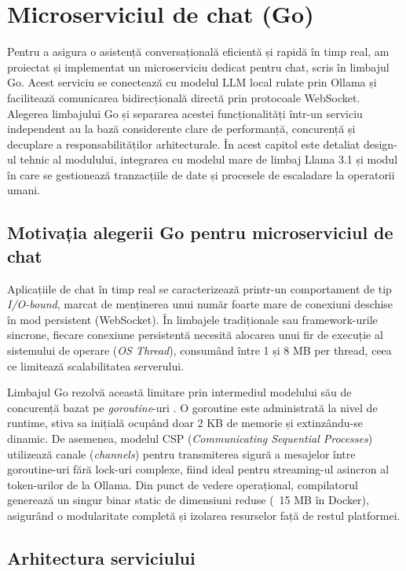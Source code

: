\chapter{Microserviciul de chat (Go)}

Pentru a asigura o asistență conversațională eficientă și rapidă în timp real, am proiectat și implementat un microserviciu dedicat pentru chat, scris în limbajul Go. Acest serviciu se conectează cu modelul LLM local rulate prin Ollama și facilitează comunicarea bidirecțională directă prin protocoale WebSocket. Alegerea limbajului Go și separarea acestei funcționalități într-un serviciu independent au la bază considerente clare de performanță, concurență și decuplare a responsabilităților arhitecturale. În acest capitol este detaliat design-ul tehnic al modulului, integrarea cu modelul mare de limbaj Llama 3.1 și modul în care se gestionează tranzacțiile de date și procesele de escaladare la operatorii umani.

\section{Motivația alegerii Go pentru microserviciul de chat}

Aplicațiile de chat în timp real se caracterizează printr-un comportament de tip \textit{I/O-bound}, marcat de menținerea unui număr foarte mare de conexiuni deschise în mod persistent (WebSocket). În limbajele tradiționale sau framework-urile sincrone, fiecare conexiune persistentă necesită alocarea unui fir de execuție al sistemului de operare (\textit{OS Thread}), consumând între 1 și 8 MB per thread, ceea ce limitează scalabilitatea serverului.

Limbajul Go rezolvă această limitare prin intermediul modelului său de concurență bazat pe \textit{goroutine}-uri \cite{go2026concurrency}. O goroutine este administrată la nivel de runtime, stiva sa inițială ocupând doar 2 KB de memorie și extinzându-se dinamic. De asemenea, modelul CSP (\textit{Communicating Sequential Processes}) utilizează canale (\textit{channels}) pentru transmiterea sigură a mesajelor între goroutine-uri fără lock-uri complexe, fiind ideal pentru streaming-ul asincron al token-urilor de la Ollama. Din punct de vedere operațional, compilatorul generează un singur binar static de dimensiuni reduse (~15 MB în Docker), asigurând o modularitate completă și izolarea resurselor față de restul platformei.

\section{Arhitectura serviciului}

